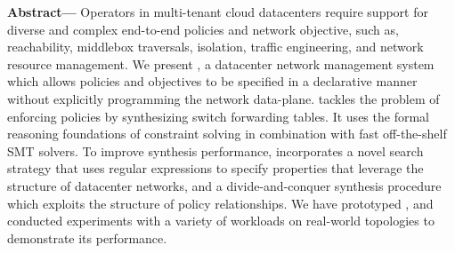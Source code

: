 
  {\bf Abstract---} Operators in multi-tenant cloud datacenters
  require support for diverse and complex end-to-end policies and
  network objective, such as, reachability, middlebox traversals,
  isolation, traffic engineering, and network resource management. We
  present \Name, a datacenter network management system which allows
  policies and objectives to be specified in a declarative manner
  without explicitly programming the network data-plane.  \name
  tackles the problem of enforcing policies by synthesizing switch
  forwarding tables. It uses the formal reasoning foundations of
  constraint solving in combination with fast off-the-shelf SMT
  solvers.  To improve synthesis performance, \Name incorporates a
  novel search strategy that uses regular expressions to specify
  properties that leverage the structure of datacenter networks,
  and a divide-and-conquer synthesis procedure which exploits the
  structure of policy relationships.  We have prototyped \Name, and conducted
  experiments with a variety of workloads on real-world topologies
  to demonstrate its  performance.

